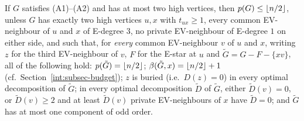 \begin{corollary}\label{cor:clatwohigh}
If $G$ satisfies {\rm(A1)}--{\rm(A2)} and has at most two high vertices,
then $p(G)\le\left\lfloor n/2 \right\rfloor$, unless $G$ has exactly two high vertices $u,x$
with $t_{ux}\ge1$, every common EV-neighbour of $u$ and $x$ of E-degree
$3$, no private EV-neighbour of E-degree $1$ on either side, and such
that, for \emph{every} common EV-neighbour $v$ of $u$ and $x$, writing $z$
for the third EV-neighbour of $v$, $F$ for the E-star at $u$ and
$\tilde G=G-F-\{xv\}$, all of the following hold:
$p(\tilde G)=\left\lfloor n/2 \right\rfloor$; $\beta(\tilde G,x)=\left\lfloor n/2 \right\rfloor+1$ (cf.\
Section~\ref{int:subsec-budget}); $z$ is buried (i.e.\ $D(z)=0$) in every
optimal decomposition of $\tilde G$; in every optimal decomposition
$\tilde D$ of $\tilde G$, either $\tilde D(v)=0$, or $\tilde D(v)\ge2$ and
at least $\tilde D(v)$ private EV-neighbours of $x$ have $\tilde D=0$; and
$\tilde G$ has at most one component of odd order.
\end{corollary}
